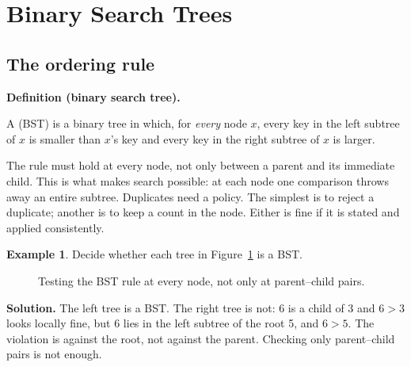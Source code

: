 \documentclass[11pt]{article}
\theoremstyle{definition}
\newtheorem{example}{Example}[section]
\newenvironment{definitionbox}[1]{%
  \par\noindent\textbf{Definition (#1).}\ \itshape
}{\par\vspace{0.3em}}
\begin{document}
\section{Binary Search Trees}

\subsection{The ordering rule}

\begin{definitionbox}{binary search tree}
A  (BST) is a binary tree in which, for \emph{every}
node $x$, every key in the left subtree of $x$ is smaller than $x$'s key and
every key in the right subtree of $x$ is larger.
\end{definitionbox}

The rule must hold at every node, not only between a parent and its immediate
child. This is what makes search possible: at each node one comparison throws
away an entire subtree. Duplicates need a policy. The simplest is to reject a
duplicate; another is to keep a count in the node. Either is fine if it is
stated and applied consistently.

\begin{example}
Decide whether each tree in Figure~\ref{fig:isbst} is a BST.

\begin{figure}[h]
  \centering
  \caption{Testing the BST rule at every node, not only at parent--child
    pairs.}
  \label{fig:isbst}
\end{figure}

\textbf{Solution.} The left tree is a BST. The right tree is not: 6 is a
child of 3 and $6>3$ looks locally fine, but 6 lies in the left subtree of
the root 5, and $6>5$. The violation is against the root, not against the
parent. Checking only parent--child pairs is not enough.
\end{example}
\end{document}
